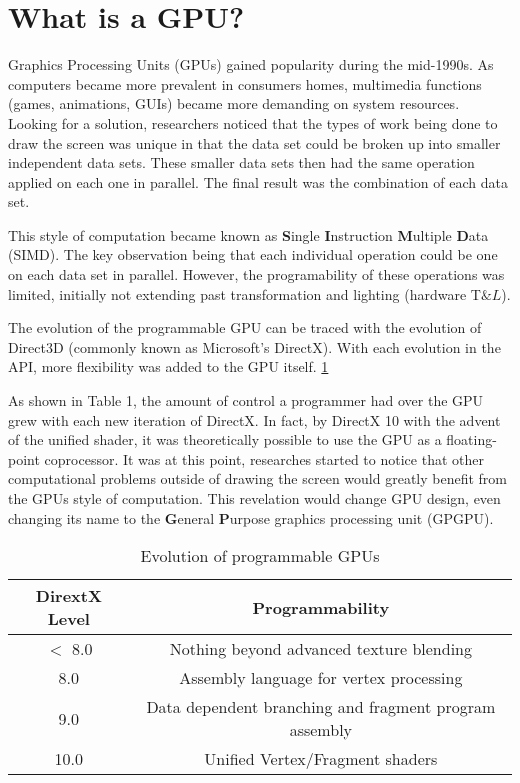 \section*{What is a GPU?}

Graphics Processing Units (GPUs) gained popularity during the mid-1990s. As computers became more prevalent in consumers homes, multimedia functions (games, animations, GUIs) became more demanding on system resources. Looking for a solution, researchers noticed that the types of work being done to draw the screen was unique in that the data set could be broken up into smaller independent data sets. These smaller data sets then had the same operation applied on each one in parallel. The final result was the combination of each data set. 

This style of computation became known as \textbf{S}ingle \textbf{I}nstruction \textbf{M}ultiple \textbf{D}ata (SIMD). The key observation being that each individual operation could be one on each data set in parallel. However, the programability of these operations was limited, initially not extending past transformation and lighting (hardware T$\&L$). 

The evolution of the programmable GPU can be traced with the evolution of Direct3D (commonly known as Microsoft's DirectX). With each evolution in the API, more flexibility was added to the GPU itself. \ref{tab:gpuevolution}

As shown in Table 1, the amount of control a programmer had over the GPU grew with each new iteration of DirectX. In fact, by DirectX 10 with the advent of the unified shader, it was theoretically possible to use the GPU as a floating-point coprocessor. It was at this point, researches started to notice that other computational problems outside of drawing the screen would greatly benefit from the GPUs style of computation. This revelation would change GPU design, even changing its name to the \textbf{G}eneral \textbf{P}urpose graphics processing unit (GPGPU). 

\begin{table}
	\begin{tabular}{|c|c|}
		\hline
		\textbf{DirextX Level} & \textbf{Programmability} \\
		\hline
		$<$ 8.0 & Nothing beyond advanced texture blending \\
		8.0 & Assembly language for vertex processing \\
		9.0 & Data dependent branching and fragment program assembly\\
		10.0 & Unified Vertex/Fragment shaders \\
		\hline
	\end{tabular}
	\caption{Evolution of programmable GPUs}
	\label{tab:gpuevolution}
\end{table}